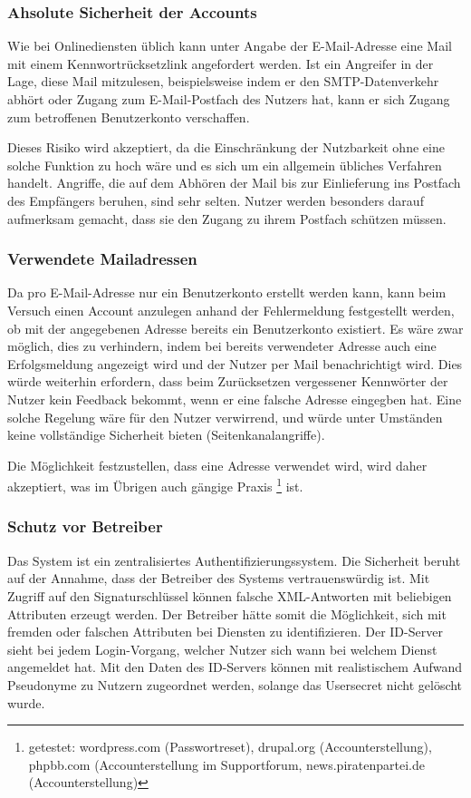\documentclass[parskip=half]{scrartcl}
\begin{document}
\subsubsection{Ahsolute Sicherheit der Accounts}
Wie bei Onlinediensten üblich kann unter Angabe der E-Mail-Adresse eine Mail mit einem Kennwortrücksetzlink angefordert werden.
Ist ein Angreifer in der Lage, diese Mail mitzulesen, beispielsweise indem er den SMTP-Datenverkehr abhört oder Zugang zum E-Mail-Postfach des Nutzers hat,
kann er sich Zugang zum betroffenen Benutzerkonto verschaffen.

Dieses Risiko wird akzeptiert, da die Einschränkung der Nutzbarkeit ohne eine solche Funktion zu hoch wäre und es sich um ein allgemein übliches Verfahren handelt.
Angriffe, die auf dem Abhören der Mail bis zur Einlieferung ins Postfach des Empfängers beruhen, sind sehr selten.
Nutzer werden besonders darauf aufmerksam gemacht, dass sie den Zugang zu ihrem Postfach schützen müssen.

\subsubsection{Verwendete Mailadressen}
Da pro E-Mail-Adresse nur ein Benutzerkonto erstellt werden kann, kann beim Versuch einen Account anzulegen anhand der Fehlermeldung festgestellt werden,
ob mit der angegebenen Adresse bereits ein Benutzerkonto existiert.
Es wäre zwar möglich, dies zu verhindern, indem bei bereits verwendeter Adresse auch eine Erfolgsmeldung angezeigt wird und der Nutzer per Mail benachrichtigt wird.
Dies würde weiterhin erfordern, dass beim Zurücksetzen vergessener Kennwörter der Nutzer kein Feedback bekommt, wenn er eine falsche Adresse eingegben hat.
Eine solche Regelung wäre für den Nutzer verwirrend, und würde unter Umständen keine vollständige Sicherheit bieten (Seitenkanalangriffe).

Die Möglichkeit festzustellen, dass eine Adresse verwendet wird, wird daher akzeptiert,
was im Übrigen auch gängige Praxis
\footnote{getestet: wordpress.com (Passwortreset), drupal.org (Accounterstellung), phpbb.com (Accounterstellung im Supportforum, news.piratenpartei.de (Accounterstellung)}
ist.

\subsubsection{Schutz vor Betreiber}
Das System ist ein zentralisiertes Authentifizierungssystem.
Die Sicherheit beruht auf der Annahme, dass der Betreiber des Systems vertrauenswürdig ist.
Mit Zugriff auf den Signaturschlüssel können falsche XML-Antworten mit beliebigen Attributen erzeugt werden.
Der Betreiber hätte somit die Möglichkeit, sich mit fremden oder falschen Attributen bei Diensten zu identifizieren.
Der ID-Server sieht bei jedem Login-Vorgang, welcher Nutzer sich wann bei welchem Dienst angemeldet hat.
Mit den Daten des ID-Servers können mit realistischem Aufwand Pseudonyme zu Nutzern zugeordnet werden, solange das Usersecret nicht gelöscht wurde.
\end{document}
